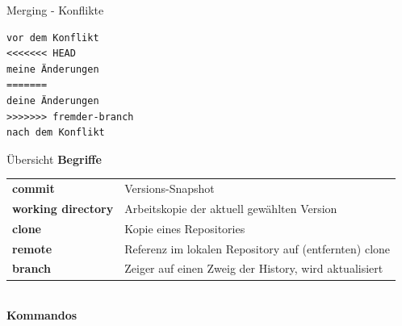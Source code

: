 \documentclass[compress,t]{beamer}
\begin{document}
\begin{frame}[fragile]{Merging - Konflikte}

    \begin{verbatim}
vor dem Konflikt
<<<<<<< HEAD
meine Änderungen
=======
deine Änderungen
>>>>>>> fremder-branch
nach dem Konflikt
    \end{verbatim}
\end{frame}

\begin{frame}{Übersicht}
    \textbf{Begriffe}\\[0.5em]

    {\scriptsize
        \begin{tabular}{p{2.5cm}l}
            \textbf{commit}
                & Versions-Snapshot\\
            \textbf{working directory}
                & Arbeitskopie der aktuell gewählten Version\\
            \textbf{clone}
                & Kopie eines Repositories\\
            \textbf{remote}
                & Referenz im lokalen Repository auf (entfernten) clone\\
            \textbf{branch}
                & Zeiger auf einen Zweig der History, wird aktualisiert\\
        \end{tabular}
    }\\[1em]

    \textbf{Kommandos}\\[0.5em]


\end{frame}
\end{document}
